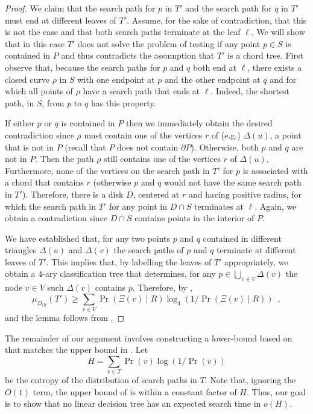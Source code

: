 \documentclass[charterfonts,lotsofwhite]{patmorin}
\newcommand{\boundary}{\partial}
\begin{document}
\begin{proof}
We claim that the search path for $p$ in $T'$ and the search path for
$q$ in $T'$ must end at different leaves of $T'$.  Assume, for the
sake of contradiction, that this is not the case and that both search
paths terminate at the leaf $\ell$. We will show that in this case
$T'$ does not solve the problem of testing if any point $p\in S$ is
contained in $P$ and thus contradicts the assumption that $T'$ is a
chord tree.  First observe that, because the search paths for $p$ and
$q$ both end at $\ell$, there exists a closed curve $\rho$ in $S$ with
one endpoint at $p$ and the other endpoint at $q$ and for which all
points of $\rho$ have a search path that ends at $\ell$.  Indeed, the
shortest path, in $S$, from $p$ to $q$ has this property.

If either $p$ or $q$ is contained in $P$ then we immediately obtain
the desired contradiction since $\rho$ must contain one of the
vertices $r$ of (e.g.) $\Delta(u)$, a point that is not in $P$ (recall
that $P$ does not contain $\boundary P$).
Otherwise, both $p$ and $q$ are not in $P$.  Then the path $\rho$
still contains one of the vertices $r$ of $\Delta(u)$.  Furthermore,
none of the vertices on the search path in $T'$ for $p$ is associated
with a chord that contains $r$ (otherwise $p$ and $q$ would not have
the same search path in $T'$).  Therefore, there is a disk $D$,
centered at $r$ and having positive radius, for which the search path
in $T'$ for any point in $D\cap S$ terminates at $\ell$.  Again, we obtain a
contradiction since $D\cap S$ contains points in the interior
of $P$.

We have established that, for any two points $p$ and $q$
contained in different triangles $\Delta(u)$ and $\Delta(v)$ the
search paths of $p$ and $q$ terminate at different leaves of $T'$.
This implies that, by labelling the leaves of $T'$ appropriately, we
obtain a $4$-ary classification tree that determines, for any
$p\in \bigcup_{v\in V} \Delta(v)$ the node $v\in V$ such
$\Delta(v)$ contains $p$.  Therefore, by ,
\[
     \mu_{D_{|R}} (T') 
	\ge \sum_{v\in V}\Pr(\Xi(v)\mid R)\log_4(1/\Pr(\Xi(v)\mid R)) \enspace ,
\]
and the lemma follows from .
\end{proof}

The remainder of our argument involves constructing a lower-bound
based on  that matches the upper bound in
.  Let 
\[
   H = \sum_{v\in T} \Pr(v)\log (1/\Pr(v))
\] 
be the entropy of the distribution of search paths in $T$.  Note that,
ignoring the $O(1)$ term,
the upper bound of  is within a constant factor of
$H$. Thus, our goal is to show that no linear decision tree has an
expected search time in $o(H)$.
\end{document}
